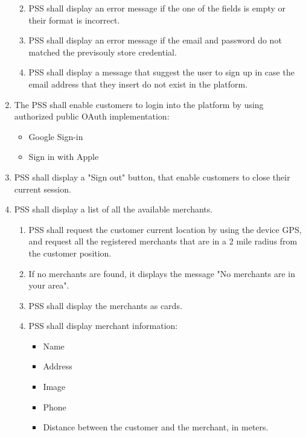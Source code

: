 \begin{enumerate}[label=SY-\arabic*]
\begin{enumerate}[label=SY-3.\arabic*]
\begin{itemize}
        \end{itemize}
        \item PSS shall display an error message if the one of the fields is 
        empty or their format is incorrect.
        \item PSS shall display an error message if the email and password 
        do not matched the previsouly store credential.
        \item PSS shall display a message that suggest the user to sign up
        in case the email address that they insert do not exist in the 
        platform.
    \end{enumerate}
    \item The PSS shall enable customers to login into the platform by using 
    authorized public OAuth implementation:
    \begin{itemize}
        \item Google Sign-in \cite{google-sign-in}
        \item Sign in with Apple \cite{sign-in-with-apple}
    \end{itemize}
    \item PSS shall display a "Sign out" button, that enable customers to close 
    their current session.
    \pagebreak
    \item PSS shall display a list of all the available merchants.
    \begin{enumerate}[label=SY-6.\arabic*]
        \item PSS shall request the customer current location by using the 
        device GPS, and request all the registered merchants that are in a 
        2 mile radius from the customer position.
        \item If no merchants are found, it displays the message "No merchants 
        are in your area".
        \item PSS shall display the merchants as 
        cards. \cite{material-design-cards}
        \item PSS shall display merchant information: 
        \begin{itemize}
            \item Name
            \item Address
            \item Image
            \item Phone
            \item Distance between the customer and the merchant, in meters.
        \end{itemize}

\end{enumerate}
\end{enumerate}

